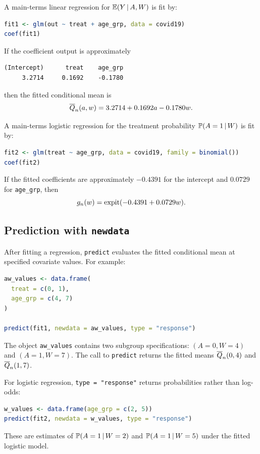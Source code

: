 A main-terms linear regression for $\mathbb{E}(Y\,\vert\, A,W)$ is fit by:
\begin{lstlisting}[language=R]
fit1 <- glm(out ~ treat + age_grp, data = covid19)
coef(fit1)
\end{lstlisting}

If the coefficient output is approximately
\begin{lstlisting}
(Intercept)      treat    age_grp
     3.2714     0.1692    -0.1780
\end{lstlisting}
then the fitted conditional mean is
\[
\overline{Q}_n(a,w)=3.2714+0.1692a-0.1780w.
\]

A main-terms logistic regression for the treatment probability $\mathbb{P}(A=1\,\vert\, W)$ is fit by:
\begin{lstlisting}[language=R]
fit2 <- glm(treat ~ age_grp, data = covid19, family = binomial())
coef(fit2)
\end{lstlisting}

If the fitted coefficients are approximately $-0.4391$ for the intercept and $0.0729$ for \texttt{age\_grp}, then
\[
g_n(w)=\operatorname{expit}(-0.4391+0.0729w).
\]

\subsection{Prediction with \texttt{newdata}}

After fitting a regression, \texttt{predict} evaluates the fitted conditional mean at specified covariate values. For example:
\begin{lstlisting}[language=R]
aw_values <- data.frame(
  treat = c(0, 1),
  age_grp = c(4, 7)
)

predict(fit1, newdata = aw_values, type = "response")
\end{lstlisting}

The object \texttt{aw\_values} contains two subgroup specifications: $(A=0,W=4)$ and $(A=1,W=7)$. The call to \texttt{predict} returns the fitted means $\overline{Q}_n(0,4)$ and $\overline{Q}_n(1,7)$.

For logistic regression, \texttt{type = "response"} returns probabilities rather than log-odds:
\begin{lstlisting}[language=R]
w_values <- data.frame(age_grp = c(2, 5))
predict(fit2, newdata = w_values, type = "response")
\end{lstlisting}

These are estimates of $\mathbb{P}(A=1\,\vert\, W=2)$ and $\mathbb{P}(A=1\,\vert\, W=5)$ under the fitted logistic model.

